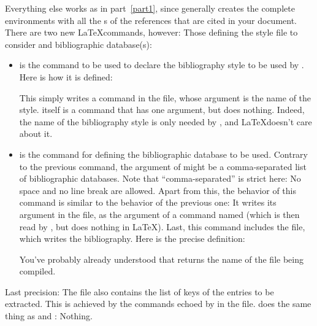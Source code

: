 Everything else works as in part~\ref{part1}, since \bt generally creates the
complete  environments with all the s of
the references that are cited in your document.
There are two new \LaTeX commands, however: Those
defining the style file to consider and bibliographic database(s):
\begin{itemize}
\item {} is the command to be used to declare the
  bibliography style to be used by \bt. Here is how it is defined:


This simply writes a  command in the  file,
whose argument is the name of the style.  itself is a
command that has one argument, but does nothing. Indeed, the
name of the bibliography style is only needed by \bt, and \LaTeX doesn't
care about it.

\item {} is the command for defining the bibliographic
  database to be used. Contrary to the previous command, the argument
  of  might be a comma-separated list of
  bibliographic databases. Note that ``comma-separated'' is strict
  here: No space and no line break are allowed. Apart from this, the
  behavior of this command is similar to the behavior of the previous
  one: It writes its argument in the  file, as the 
  argument of
  a command named  (which is then read by \bt, 
  but does nothing in \LaTeX).  Last, this
   command includes the  file, 
  which writes
  the bibliography. Here is the precise definition:

You've probably already understood that  returns the name
of the file being compiled.
\end{itemize}


Last precision: The  file also contains the list of keys of
the entries to be extracted. This is achieved by the 
commands echoed by  in the  file. 
does the same thing as  and : Nothing.


